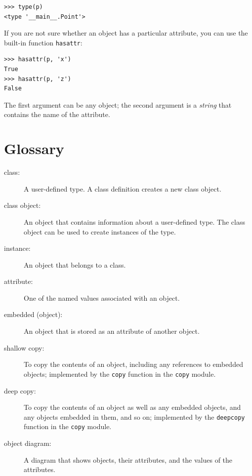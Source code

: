 \documentclass[10pt]{book}
\begin{document}
\begin{verbatim}
>>> type(p)
<type '__main__.Point'>
\end{verbatim}
%
If you are not sure whether an object has a particular attribute,
you can use the built-in function {\tt hasattr}:

\begin{verbatim}
>>> hasattr(p, 'x')
True
>>> hasattr(p, 'z')
False
\end{verbatim}
%
The first argument can be any object; the second argument is a {\em
string} that contains the name of the attribute.


\section{Glossary}

\begin{description}

\item[class:] A user-defined type.  A class definition creates a new
class object.

\item[class object:] An object that contains information about a
user-defined type.  The class object can be used to create instances
of the type.

\item[instance:] An object that belongs to a class.

\item[attribute:] One of the named values associated with an object.

\item[embedded (object):] An object that is stored as an attribute
of another object.

\item[shallow copy:] To copy the contents of an object, including
any references to embedded objects;
implemented by the {\tt copy} function in the {\tt copy} module.

\item[deep copy:] To copy the contents of an object as well as any
embedded objects, and any objects embedded in them, and so on;
implemented by the {\tt deepcopy} function in the {\tt copy} module.

\item[object diagram:] A diagram that shows objects, their
attributes, and the values of the attributes.

\end{description}
\end{document}
